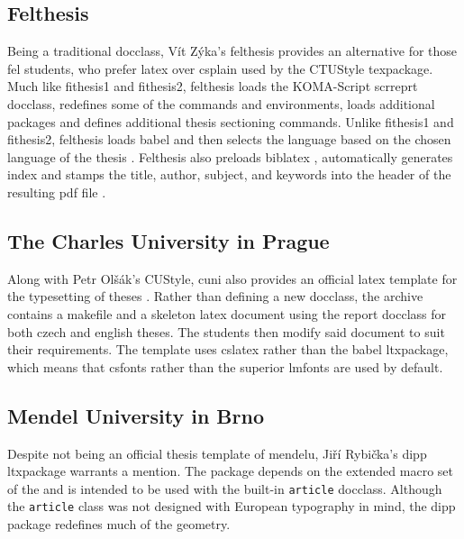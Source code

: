       \subsection{Felthesis}
      Being a traditional \gls{docclass}, Vít Zýka's felthesis provides an alternative for those \gls{fel} students, who prefer \gls{latex} over \gls{csplain} used by the CTUStyle \gls{texpackage}. Much like fithesis1 and fithesis2, felthesis loads the KOMA-Script scrreprt \gls{docclass}, redefines some of the commands and environments, loads additional packages and defines additional thesis sectioning commands. Unlike fithesis1 and fithesis2, felthesis loads babel and then selects the language based on the chosen language of the thesis \cite[lines 687--691]{felthesisCode} . Felthesis also preloads biblatex \pending{} \cite[line 722]{felthesisCode}, automatically generates index \pending{} \cite[line 763]{felthesisCode} and stamps the title, author, subject, and keywords into the header of the resulting \gls{pdf} file \cite[lines 959--971]{felthesisCode} .

      \subsection{The Charles University in Prague}
      Along with Petr Olšák's CUStyle, \gls{cuni} also provides an official \gls{latex} template for the typesetting of theses \cite{cunisablona}. Rather than defining a new \gls{docclass}, the archive contains a \gls{makefile} and a skeleton \gls{latex} document using the report \gls{docclass} for both czech and english theses. The students then modify said document to suit their requirements. The template uses \gls{cslatex} rather than the babel \gls{ltxpackage}, which means that \gls{csfonts} rather than the superior \gls{lmfonts} \cite{cslatexvsbabel} are used by default.

      \subsection{Mendel University in Brno}
      Despite not being an official thesis template of \gls{mendelu}, Jiří Rybička's dipp \gls{ltxpackage} warrants a mention. The package depends on the extended macro set of the   and is intended to be used with the built-in \texttt{article} \gls{docclass}. Although the \texttt{article} class was not designed with European typography in mind, the dipp package redefines much of the geometry.

